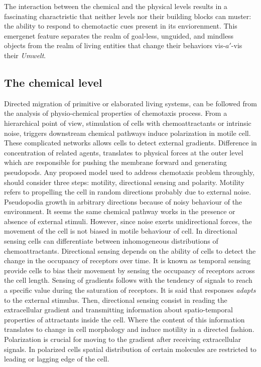 \documentclass[10pt,letterpaper]{article}
\begin{document}
The interaction between the chemical and the physical levels results in a fascinating charactristic that neither levels nor their building blocks can muster: the ability to respond to chemotactic cues present in its  enviorenment. This emergenet feature separates the realm of goal-less, unguided, and mindless objects from the realm of living entities that change their behaviors vis-${a}'$-vis their \textit{Umwelt}.

\subsection*{The chemical level}
Directed migration of primitive or elaborated living systems, can be followed from the analysis of physio-chemical properties of  chemotaxis process. From a hierarchical point of view, stimulation of cells with chemoattractants or intrinsic noise, triggers downstream chemical pathways induce polarization in motile cell. These complicated networks allows cells to detect external gradients. Difference in concentration of related agents, translates to physical forces at the outer level which are responsible for pushing the membrane forward and generating pseudopods. Any proposed model used to address chemotaxis problem throughly, should consider three steps: motility, directional sensing and polarity. Motility refers to propelling the cell in random directions probably due to external noise. Pseudopodia growth in arbitrary directions because of noisy behaviour of the environment. It seems the same chemical pathway works in the presence or absence of external stimuli. However, since noise exerts unidirectional forces, the movement of the cell is not biased in motile behaviour of cell. In directional sensing cells can differentiate between inhomogeneous distributions of chemoattractants. Directional sensing depends on the ability of cells to detect the change in the occupancy of receptors over time. It is known as temporal sensing provide cells to bias their movement by sensing the occupancy of receptors across the cell length. Sensing of gradients follows with the tendency of signals to reach a specific value during the saturation of receptors. It is said that responses \textit{adapts} to the external stimulus. Then, directional sensing consist in reading the extracellular gradient and transmitting information about spatio-temporal properties of attractants inside the cell. Where the content of this information translates to change in cell morphology and induce motility in a directed fashion. Polarization is crucial for moving to the gradient after receiving extracellular signals. In polarized cells spatial distribution of certain molecules are restricted to leading or lagging edge of the cell.\\
\end{document}

